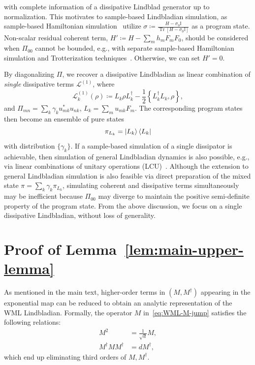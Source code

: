 \documentclass[superscriptaddress,amsmath,amssymb,aps,pra,letterpaper,tightenlines,notitlepages,12pt]{revtex4-2}
\begin{document}
with complete information of a dissipative Lindblad generator up to normalization. This motivates to sample-based Lindbladian simulation, as sample-based Hamiltonian simulation~\cite{lloyd2014QuantumPrincipalComponent, kimmel2017HamiltonianSimulationOptimal, wei2024SimulatingNoncompletelyPositive, go2025SamplebasedHamiltonianLindbladian} utilize $\sigma\coloneq \frac{H-\sigma_0 \mathbb{I}}{\operatorname{Tr}[H-\sigma_0 \mathbb{I}]}$ as a program state. Non-scalar residual coherent term, $H'\coloneq H-\sum_mh_mF_mF_0$, should be considered when $\Pi_{00}$ cannot be bounded, e.g., with separate sample-based Hamiltonian simulation and Trotterization techniques~\cite{patel2023WaveMatrixLindbladizationa}. Otherwise, we can set $H'=0$.

By diagonalizing $\Pi$, we recover a dissipative Lindbladian as linear combination of \emph{single} dissipative terms $\mathcal{L}^{(1)}$, where 
\begin{equation}
    \label{eq:lindblad_dynamics_app}
    \mathcal{L}^{(1)}_k(\rho) \coloneqq L_k \rho L_k^\dagger - \frac{1}{2} \left\{L_k^\dagger L_k, \rho \right\}, 
\end{equation}
and $\Pi_{mn}=\sum_k\gamma_ku^\ast_{mk}u_{nk}$, $L_k=\sum_m u_{mk}F_m$.
The corresponding program states then become an ensemble of pure states
\begin{equation}
    \pi_{L_k}=\ket{L_k}\bra{L_k}
\end{equation}
with distribution $\{\gamma_k\}$. If a sample-based simulation of a single dissipator is achievable, then simulation of general Lindbladian dynamics is also possible, e.g., via linear combinations of unitary operations (LCU)~\cite[Algorithm 1]{patel2023WaveMatrixLindbladizationa}. Although the extension to general Lindbladian simulation is also feasible via direct preparation of the mixed state $\pi = \sum_k \gamma_k \pi_{L_k}$, simulating coherent and dissipative terms simultaneously may be inefficient because $\Pi_{00}$ may diverge to maintain the positive semi-definite property of the program state. From the above discussion, we focus on a single dissipative Lindbladian, without loss of generality.

\section{Proof of Lemma~\ref{lem:main-upper-lemma}} \label{appendix:main-upper-proof}
As mentioned in the main text, higher-order terms in $(M, M^\dagger)$ appearing in the exponential map can be reduced to obtain an analytic representation of the WML Lindbladian. Formally, the operator $M$ in~\eqref{eq:WML-M-jump} satisfies the following relations:
\begin{align}
M^2 & =\frac{1}{\sqrt{d}}M,\\
M^\dagger MM^\dagger & = dM^\dagger,
\end{align}
which end up eliminating third orders of $M, M^\dagger$. 
\end{document}
